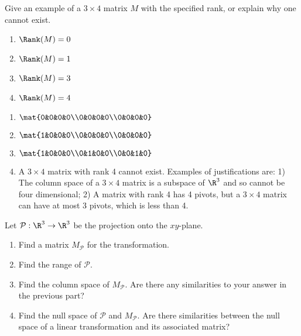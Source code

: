 \begin{exercises}
\begin{problist}
		\prob Give an example of a $3\times4$ matrix $M$ with the specified rank, or explain why one cannot exist.
		\begin{enumerate}
			\item $\Rank(M) = 0$
			\item $\Rank(M) = 1$
			\item $\Rank(M) = 3$
			\item $\Rank(M) = 4$
		\end{enumerate}

		\begin{solution}
			\begin{enumerate}
				\item $\mat{0&0&0&0\\0&0&0&0\\0&0&0&0}$

				\item $\mat{1&0&0&0\\0&0&0&0\\0&0&0&0}$

				\item $\mat{1&0&0&0\\0&1&0&0\\0&0&1&0}$

				\item A $3\times4$ matrix with rank 4 cannot exist. Examples of justifications
					are: 1) The column space of a $3\times 4$ matrix is a subspace of $\R^3$
					and so cannot be four dimensional; 2) A matrix with rank 4
					has 4 pivots, but a $3\times4$ matrix can have at most 3 pivots, which is
					less than 4.
			\end{enumerate}
		\end{solution}

		\prob Let $\mathcal{P}:\R^3\to\R^3$ be the projection onto the $xy$-plane.
		\begin{enumerate}
			\item Find a matrix $M_\mathcal{P}$ for the transformation.
			\item Find the range of $\mathcal{P}$.
			\item Find the column space of $M_\mathcal{P}$. Are there any similarities to your answer in the previous part?
			\item Find the null space of $\mathcal{P}$ and $M_\mathcal{P}$. Are there similarities between the null space of a linear transformation and its associated matrix?
		\end{enumerate}


\end{problist}
\end{exercises}
